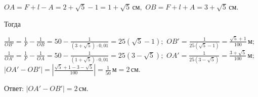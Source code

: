\documentclass[12pt,a4paper]{article}
\begin{document}
{$OA=F + l - A=2 + \sqrt{5} - 1=1 + \sqrt{5} \,\text{см},$ 
$OB=F + l + A=3 + \sqrt{5} \,\text{см}.$

Тогда 

$\frac{1}{OB'} = \frac{1}{F} - \frac{1}{OB} =50 - \frac{1}{( 3 + \sqrt{5} ) \cdot 0{,}01} =25 ( \sqrt{5} - 1 ) ;$
$OB'= \frac{1}{25 ( \sqrt{5} - 1 )} = \frac{\sqrt{5} + 1}{100} \,\text{м};$
$\frac{1}{OA'} = \frac{1}{F} - \frac{1}{OA} =50 - \frac{1}{( 1 + \sqrt{5} ) \cdot 0{,}01} =25 ( 3 - \sqrt{5} ) ;$
$OA'= \frac{1}{25 ( 3 - \sqrt{5} )} = \frac{3 + \sqrt{5}}{100} \,\text{м};$
$|OA' - OB'|=| \frac{\sqrt{5} + 1 - 3 - \sqrt{5}}{100} |= \frac{1}{50} \,\text{м} = 2\,\text{см}.$

Ответ: $|OA' - OB'|=2\,\text{см}.$
}
\end{document}
